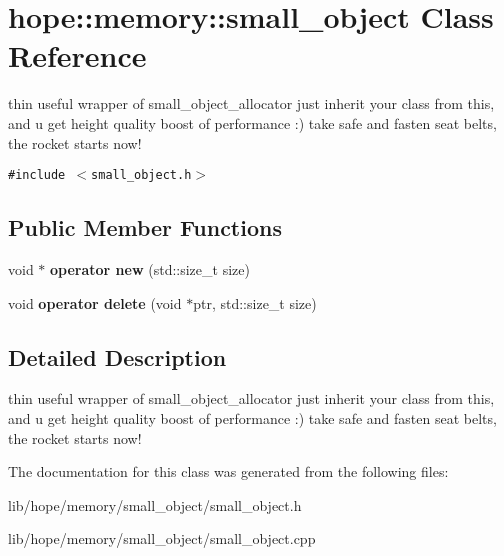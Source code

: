 \hypertarget{classhope_1_1memory_1_1small__object}{
\section{hope::memory::small\_\-object Class Reference}
\label{classhope_1_1memory_1_1small__object}
}
thin useful wrapper of small\_\-object\_\-allocator just inherit your class from this, and u get height quality boost of performance :) take safe and fasten seat belts, the rocket starts now!  


{\tt \#include $<$small\_\-object.h$>$}

\subsection*{Public Member Functions}
\begin{CompactItemize}
\item 
\hypertarget{classhope_1_1memory_1_1small__object_d91fb7945fdefd0052d9f51128aaf5ed}{
void $\ast$ \textbf{operator new} (std::size\_\-t size)}
\label{classhope_1_1memory_1_1small__object_d91fb7945fdefd0052d9f51128aaf5ed}

\item 
\hypertarget{classhope_1_1memory_1_1small__object_6d6af0257cd010419871f45b2d8aedf9}{
void \textbf{operator delete} (void $\ast$ptr, std::size\_\-t size)}
\label{classhope_1_1memory_1_1small__object_6d6af0257cd010419871f45b2d8aedf9}

\end{CompactItemize}


\subsection{Detailed Description}
thin useful wrapper of small\_\-object\_\-allocator just inherit your class from this, and u get height quality boost of performance :) take safe and fasten seat belts, the rocket starts now! 

The documentation for this class was generated from the following files:\begin{CompactItemize}
\item 
lib/hope/memory/small\_\-object/small\_\-object.h\item 
lib/hope/memory/small\_\-object/small\_\-object.cpp\end{CompactItemize}
